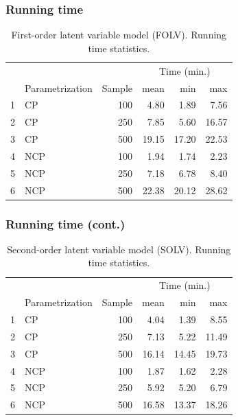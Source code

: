 \documentclass[arial,12pt,xcolor=dvipsnames]{beamer}
\begin{document}
%
\begin{frame}
	\frametitle{Running time }
	\begin{table}[h]
		\centering
		\begin{tabular}{rlrrrr}
			\hline
			\multicolumn{3}{c}{ }& \multicolumn{3}{c}{ Time (min.) } \\ 
			\cmidrule(rl){4-6} 
			& Parametrization & Sample & mean & min & max \\ 
			\hline\hline
			1 & CP & 100 & 4.80 & 1.89 & 7.56 \\ 
			2 & CP & 250 & 7.85 & 5.60 & 16.57 \\ 
			3 & CP & 500 & 19.15 & 17.20 & 22.53 \\ 
			\hline
			4 & NCP & 100 & 1.94 & 1.74 & 2.23 \\ 
			5 & NCP & 250 & 7.18 & 6.78 & 8.40 \\ 
			6 & NCP & 500 & 22.38 & 20.12 & 28.62 \\
			\hline
		\end{tabular}
		\caption{First-order latent variable model (FOLV). Running time statistics.} 
		\label{tab:FOLV_time}
	\end{table}
\end{frame}
%
\begin{frame}
	\frametitle{Running time (cont.)}
	\begin{table}[h]
		\centering
		\begin{tabular}{rlrrrr}
			\hline
			\multicolumn{3}{c}{ }& \multicolumn{3}{c}{ Time (min.) } \\ 
			\cmidrule(rl){4-6} 
			& Parametrization & Sample & mean & min & max \\ 
			\hline\hline
			1 & CP & 100 & 4.04 & 1.39 & 8.55 \\ 
			2 & CP & 250 & 7.13 & 5.22 & 11.49 \\ 
			3 & CP & 500 & 16.14 & 14.45 & 19.73 \\ 
			\hline
			4 & NCP & 100 & 1.87 & 1.62 & 2.28 \\ 
			5 & NCP & 250 & 5.92 & 5.20 & 6.79 \\ 
			6 & NCP & 500 & 16.58 & 13.37 & 18.26 \\
			\hline
		\end{tabular}
		\caption{Second-order latent variable model (SOLV). Running time statistics.} 
		\label{tab:SOLV_time}
	\end{table}
\end{frame}
\end{document}
